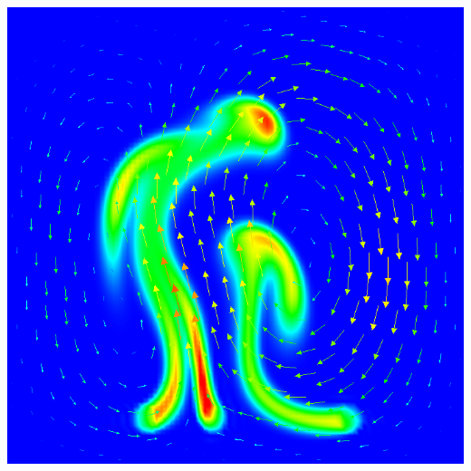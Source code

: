 \documentclass[compress,newPxFont,sthlmFooter]{beamer}
\begin{document}
\begin{frame}[plain]
\begin{center}
        \includegraphics[align=c, height=0.30\textheight]{buoyancy.png}
    \end{center}
\end{frame}
\end{document}
